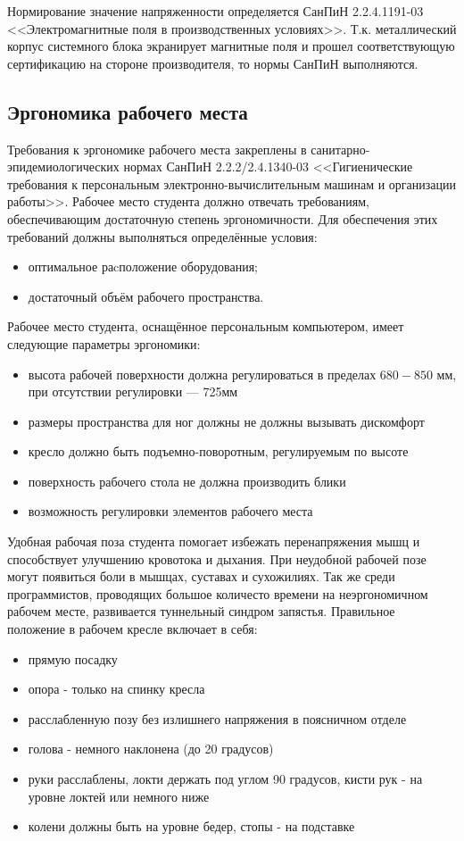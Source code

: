 Нормирование значение напряженности определяется СанПиН 2.2.4.1191-03 <<Электро\-магнитные поля в производственных условиях>>. Т.к. металличес\-кий корпус системного блока экранирует магнитные поля и прошел соответ\-ствующую сертификацию на стороне производителя, то нормы СанПиН вы\-полняются.

\subsection{Эргономика рабочего места}

\label{erg}

Требования к эргономике рабочего места закреплены в санитарно-эпиде\-миологических нормах СанПиН 2.2.2/2.4.1340-03 <<Гигиенические требования к персональным электронно-вычислительным машинам и организации рабо\-ты>>. Рабочее ме\-сто студента должно отвечать требованиям, обеспечивающим достаточную степень эрго\-номичности. Для обеспечения этих требований дол\-жны выполняться опре\-делённые условия: 
\begin{itemize}
\item оптимальное раcположение оборудования;
\item достаточный объём рабочего пространства.
\end{itemize}


Рабочее место студента, оснащённое персональным компьютером, име\-ет следующие параметры эргономики: 
\begin{itemize}
\item высота рабочей поверхности должна регулироваться в пределах $680-850$ мм, при отсутствии регулировки — 725мм
\item размеры пространства для ног должны не должны вызывать диском\-форт
\item кресло должно быть подъемно-поворотным, регулируемым по высоте
\item поверхность рабочего стола не должна производить блики
\item возможность регулировки элементов рабочего места
\end{itemize}

Удобная рабочая поза студента помогает избежать перенапряжения мышц и спо\-собствует улучшению кровотока и дыхания. При неудобной рабочей позе могут появиться боли в мышцах, суставах и сухожилиях. Так же среди программистов, проводящих большое количесто времени на неэргономичном рабочем месте, развивается туннельный синдром запястья.
Правильное по\-ложение в рабочем кресле включает в себя:
\begin{itemize}
\item прямую посадку
\item опора - только на спинку кресла
\item расслабленную позу без излишнего напряжения в поясничном отделе
\item голова  - немного наклонена (до 20 градусов)
\item руки расслаблены, локти держать под углом 90 градусов, кисти рук - на уровне локтей или немного ниже
\item колени должны быть на уровне бедер, стопы - на подставке
\end{itemize}

